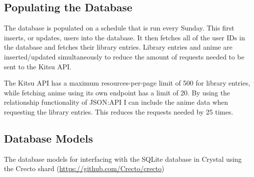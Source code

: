 \captionsetup{type=figure}


\newpage
\captionsetup{type=figure}


\captionsetup{type=figure}


\newpage
\subsection{Populating the Database}

The database is populated on a schedule that is run every Sunday. This first inserts, or updates, users into the database. It then fetches all of the user IDs in the database and fetches their library entries. Library entries and anime are inserted/updated simultaneously to reduce the amount of requests needed to be sent to the Kitsu API.

The Kitsu API has a maximum resources-per-page limit of 500 for library entries, while fetching anime using its own endpoint has a limit of 20. By using the relationship functionality of JSON:API I can include the anime data when requesting the library entries. This reduces the requests needed by 25 times.

\captionsetup{type=figure}


\newpage
\captionsetup{type=figure}


\newpage
\captionsetup{type=figure}


\newpage
\captionsetup{type=figure}


\newpage
\captionsetup{type=figure}


\newpage
\captionsetup{type=figure}


\newpage
\subsection{Database Models}

The database models for interfacing with the SQLite database in Crystal using the Crecto shard (\url{https://github.com/Crecto/crecto})

\captionsetup{type=figure}

